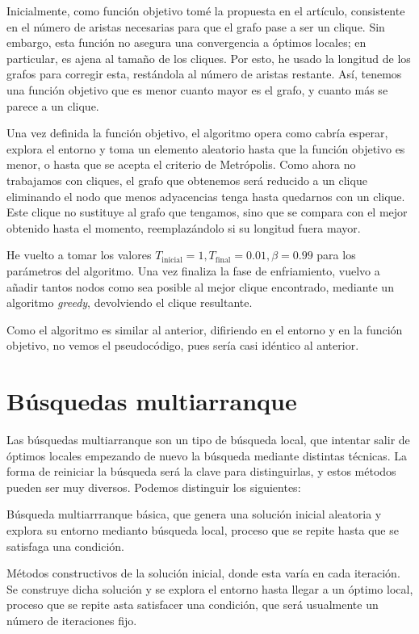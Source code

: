 Inicialmente, como función objetivo tomé la propuesta en el artículo, consistente en el número de aristas necesarias
para que el grafo pase a ser un clique. Sin embargo, esta función no asegura una convergencia a óptimos locales;
en particular, es ajena al tamaño de los cliques. Por esto, he usado la longitud de los grafos para corregir esta,
restándola al número de aristas restante. Así, tenemos una función objetivo que es menor cuanto mayor es el grafo,
y cuanto más se parece a un clique.

Una vez definida la función objetivo, el algoritmo opera como cabría esperar, explora el entorno y toma un elemento
aleatorio hasta que la función objetivo es menor, o hasta que se acepta el criterio de Metrópolis. Como ahora no
trabajamos con cliques, el grafo que obtenemos será reducido a un clique eliminando el nodo que menos adyacencias
tenga hasta quedarnos con un clique. Este clique no sustituye al grafo que tengamos, sino que se compara con el
mejor obtenido hasta el momento, reemplazándolo si su longitud fuera mayor.

He vuelto a tomar los valores $T_{\text{inicial}} = 1, T_{\text{final}} = 0.01, \beta = 0.99$ para los parámetros
del algoritmo. Una vez finaliza la fase de enfriamiento, vuelvo a añadir tantos nodos como sea posible al mejor
clique encontrado, mediante un algoritmo \textit{greedy}, devolviendo el clique resultante.

Como el algoritmo es similar al anterior, difiriendo en el entorno y en la función objetivo,
no vemos el pseudocódigo, pues sería casi idéntico al anterior.

\section{Búsquedas multiarranque}

Las búsquedas multiarranque son un tipo de búsqueda local, que intentar salir de óptimos locales
empezando de nuevo la búsqueda mediante distintas técnicas. La forma de reiniciar la búsqueda será
la clave para distinguirlas, y estos métodos pueden ser muy diversos. Podemos distinguir los siguientes:

Búsqueda multiarrranque básica, que genera una solución inicial aleatoria y explora su entorno
medianto búsqueda local, proceso que se repite hasta que se satisfaga una condición.

Métodos constructivos de la solución inicial, donde esta varía en cada iteración. Se construye dicha
solución y se explora el entorno hasta llegar a un óptimo local, proceso que se repite asta
satisfacer una condición, que será usualmente un número de iteraciones fijo.

